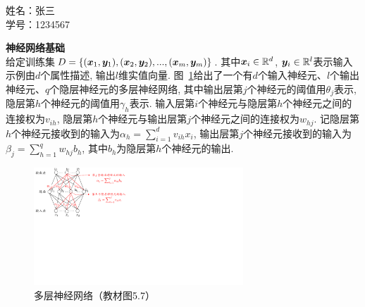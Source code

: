 \documentclass[answers]{exam}  %
\begin{document}
\Large
\noindent 
姓名：张三 \\
学号：1234567 \\
\begin{questions}
\question [20] \textbf{神经网络基础} \\

给定训练集$D=\{({\boldsymbol{x}}_1, \boldsymbol{y}_1), ({\boldsymbol{x}}_2, \boldsymbol{y}_2), ..., ({\boldsymbol{x}}_m, \boldsymbol{y}_m)\}$. 其中${\boldsymbol{x}}_i \in \mathbb{R}^d$,
$\boldsymbol{y}_i \in \mathbb{R}^l$表示输入示例由$d$个属性描述,
输出$l$维实值向量.
图~\ref{ch5_img:mlp}给出了一个有$d$个输入神经元、$l$个输出神经元、$q$个隐层神经元的多层神经网络, 其中输出层第$j$个神经元的阈值用$\theta_j$表示, 隐层第$h$个神经元的阈值用$\gamma_h$表示. 输入层第$i$个神经元与隐层第$h$个神经元之间的连接权为$v_{ih}$,
隐层第$h$个神经元与输出层第$j$个神经元之间的连接权为$w_{hj}$.
记隐层第$h$个神经元接收到的输入为$\alpha_h=\sum_{i=1}^d v_{ih}x_i$,
输出层第$j$个神经元接收到的输入为$\beta_j=\sum_{h=1}^q w_{hj}b_h$,
其中$b_h$为隐层第$h$个神经元的输出.
\begin{figure}[ht]
    \centering
    \includegraphics[width=0.70\textwidth]{figure/ch5_nn.pdf}
    \caption{多层神经网络（教材图5.7）}\label{ch5_img:mlp}
\end{figure}


\end{questions}
\end{document}
